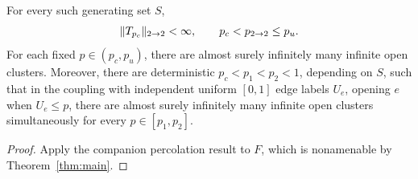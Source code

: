 \begin{corollary}\label{cor:percolation}
For every such generating set \(S\),
\[
  \lVert T_{p_c}\rVert_{2\to2}<\infty,\qquad p_c<p_{2\to2}\le p_u.
\]
For each fixed \(p\in(p_c,p_u)\), there are almost surely infinitely many
infinite open clusters. Moreover, there are deterministic
\(p_c<p_1<p_2<1\), depending on \(S\), such that in the coupling with
independent uniform \([0,1]\) edge labels \(U_e\), opening \(e\) when \(U_e\le p\),
there are almost surely infinitely many infinite open clusters
simultaneously for every \(p\in[p_1,p_2]\).
\end{corollary}

\begin{proof}
Apply the companion percolation result
\cite[Corollary~1.2]{OpenAIPercolation2026} to \(F\), which is nonamenable
by Theorem~\ref{thm:main}.
\end{proof}
